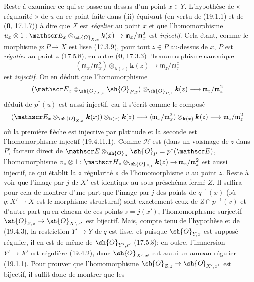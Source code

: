 Reste à examiner ce qui se passe au-dessus d'un point $x\in Y$. L'hypothèse de « régularité » de $u$ en ce point faite dans (iii) équivaut (en vertu de (19.1.1) et de (\textbf{0}, 17.1.7)) à dire que $X$ est \emph{régulier} au point $x$ et que l'homomorphisme $u_x\otimes1:\mathscr E_x\otimes_{\sh{O}_{X,x}}\boldsymbol{k}(x)\to\mathfrak m_x/\mathfrak m_x^2$ est \emph{injectif}. Cela étant, comme le morphisme $p:P\to X$ est lisse (17.3.9), pour tout $z\in P$ au-dessus de $x$, $P$ est \emph{régulier} au point $z$ (17.5.8); en outre (\textbf{0}, 17.3.3) l'homomorphisme canonique
\begin{equation}
  (\mathfrak m_x/\mathfrak m_x^2)\otimes_{\mathbf k(x)}\boldsymbol{k}(z)\longrightarrow\mathfrak m_z/\mathfrak m_z^2
  \tag{19.4.11.1}\label{IV.19.4.11.1}
\end{equation}
est \emph{injectif}. On en déduit que l'homomorphisme
\[
  (\mathscr E_x\otimes_{\sh{O}_{X,x}}\sh{O}_{P,z})\otimes_{\sh{O}_{P,z}}\boldsymbol{k}(z)\longrightarrow\mathfrak m_z/\mathfrak m_z^2
\]
déduit de $p^*(u)$ est aussi injectif, car il s'écrit comme le composé
\[
  (\mathscr E_x\otimes_{\sh{O}_{X,x}}\boldsymbol{k}(x))\otimes_{\mathbf k(x)}\boldsymbol{k}(z)\longrightarrow(\mathfrak m_x/\mathfrak m_x^2)\otimes_{\mathbf k(x)}\boldsymbol{k}(z)\longrightarrow\mathfrak m_z/\mathfrak m_z^2
\]
où la première flèche est injective par platitude et la seconde est l'homomorphisme injectif (19.4.11.1). Comme $\mathscr H$ est (dans un voisinage de $z$ dans $P$) facteur direct de $\mathscr E\otimes_{\sh{O}_X}\sh{O}_P=p^*(\mathscr E)$, l'homomorphisme $v_z\otimes1:\mathscr H_z\otimes_{\sh{O}_{P,z}}\boldsymbol{k}(z)\to\mathfrak m_z/\mathfrak m_z^2$ est aussi injectif, ce qui établit la « régularité » de l'homomorphisme $v$ au point $z$. Reste à voir que l'image par $j$ de $X'$ est identique au sous-préschéma fermé $Z$. Il suffira pour cela de montrer d'une part que l'image par $j$ des points de $q^{-1}(x)$ (où $q:X'\to X$ est le morphisme structural) sont exactement ceux de $Z\cap p^{-1}(x)$ et d'autre part qu'en chacun de ces points $z=j(x')$, l'homomorphisme surjectif $\sh{O}_{Z,z}\to\sh{O}_{X',x'}$ est bijectif. Mais, compte tenu de l'hypothèse et de (19.4.3), la restriction $Y'\to Y$ de $q$ est lisse, et puisque $\sh{O}_{Y,x}$ est supposé régulier, il en est de même de $\sh{O}_{Y',x'}$ (17.5.8); en outre, l'immersion $Y'\to X'$ est régulière (19.4.2), donc $\sh{O}_{X',x'}$ est aussi un anneau régulier (19.1.1). Pour prouver que l'homomorphisme $\sh{O}_{Z,z}\to\sh{O}_{X',x'}$ est bijectif, il suffit donc de montrer que les
